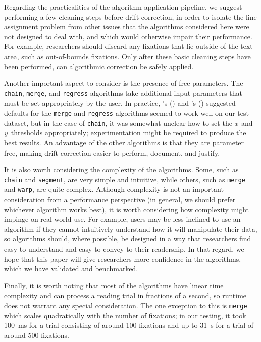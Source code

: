 \documentclass[doc,biblatex]{apa7}
\newcommand\possessivecite[1]{\citeauthor{#1}'s (\citeyear{#1})} %
\begin{document}
Regarding the practicalities of the algorithm application pipeline, we suggest performing a few cleaning steps before drift correction, in order to isolate the line assignment problem from other issues that the algorithms considered here were not designed to deal with, and which would otherwise impair their performance. For example, researchers should discard any fixations that lie outside of the text area, such as out-of-bounds fixations. Only after these basic cleaning steps have been performed, can algorithmic correction be safely applied.

Another important aspect to consider is the presence of free parameters. The \texttt{chain}, \texttt{merge}, and \texttt{regress} algorithms take additional input parameters that must be set appropriately by the user. In practice, \possessivecite{Spakov:2019} and \possessivecite{Cohen:2013} suggested defaults for the \texttt{merge} and \texttt{regress} algorithms seemed to work well on our test dataset, but in the case of \texttt{chain}, it was somewhat unclear how to set the \textit{x}~and \textit{y}~thresholds appropriately; experimentation might be required to produce the best results. An advantage of the other algorithms is that they are parameter free, making drift correction easier to perform, document, and justify.

It is also worth considering the complexity of the algorithms. Some, such as \texttt{chain} and \texttt{segment}, are very simple and intuitive, while others, such as \texttt{merge} and \texttt{warp}, are quite complex. Although complexity is not an important consideration from a performance perspective (in general, we should prefer whichever algorithm works best), it is worth considering how complexity might impinge on real-world use. For example, users may be less inclined to use an algorithm if they cannot intuitively understand how it will manipulate their data, so algorithms should, where possible, be designed in a way that researchers find easy to understand and easy to convey to their readership. In that regard, we hope that this paper will give researchers more confidence in the algorithms, which we have validated and benchmarked.

Finally, it is worth noting that most of the algorithms have linear time complexity and can process a reading trial in fractions of a second, so runtime does not warrant any special consideration. The one exception to this is \texttt{merge} which scales quadratically with the number of fixations; in our testing, it took 100~ms for a trial consisting of around 100 fixations and up to 31~s for a trial of around 500 fixations.
\end{document}

